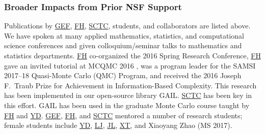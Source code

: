 \documentclass[11pt]{NSFamsart}
\newcommand{\FH}{\hyperlink{FHlink}{FH}\xspace}
\newcommand{\SCTC}{\hyperlink{SCTClink}{SCTC}\xspace}
\newcommand{\GEF}{\hyperlink{GEFlink}{GEF}\xspace}
\newcommand{\YD}{\hyperlink{YDlink}{YD}\xspace}
\newcommand{\LJ}{\hyperlink{LJlink}{LJ}\xspace}
\newcommand{\XT}{\hyperlink{XTlink}{XT}\xspace}
\newcommand{\JL}{\hyperlink{JLlink}{JL}\xspace}
\newcommand{\GAIL}{GAIL\xspace}
\begin{document}
\subsubsection{Broader Impacts from Prior NSF Support} \label{prevBIsect}
Publications by \GEF, \FH,  \SCTC, students, and collaborators are listed above.  We have spoken at many applied mathematics, statistics,
and computational science conferences and given colloquium/seminar talks to mathematics and
statistics departments.  \FH co-organized the
2016 Spring Research
Conference, \FH gave an invited tutorial
at MCQMC 2016
\cite{Hic17a}, was a program leader for the SAMSI 2017--18 Quasi-Monte Carlo (QMC) Program, and received the 2016 Joseph F.\ Traub Prize for Achievement in Information-Based Complexity.  This research has been implemented in our open-source library
\GAIL \cite{ChoEtal21a}.  \SCTC has been key in this effort.  \GAIL has been used in the graduate Monte Carlo course taught by \FH and \YD. \GEF, \FH, and \SCTC mentored a number of
research students;  female students include \YD, \LJ, \JL, \XT, and Xiaoyang Zhao (MS 2017).

\end{document}
